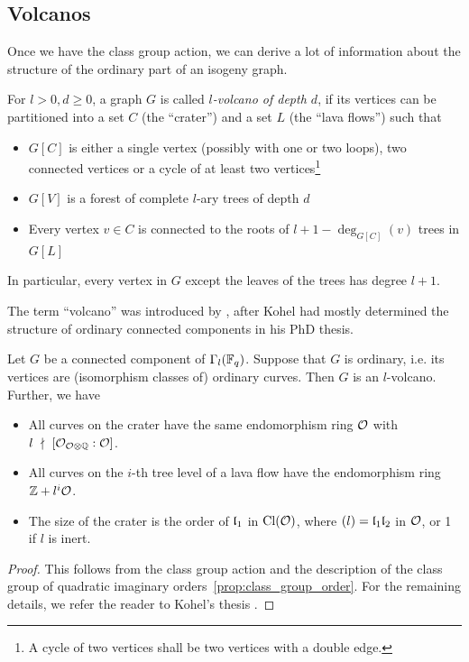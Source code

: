 \subsection{Volcanos}
Once we have the class group action, we can derive a lot of information about the structure of the ordinary part of an isogeny graph.
\begin{definition}
    For $l > 0, d \geq 0$, a graph $G$ is called \emph{$l$-volcano of depth $d$}, if its vertices can be partitioned into a set $C$ (the ``crater'') and a set $L$ (the ``lava flows'') such that
    \begin{itemize}
        \item $G[C]$ is either a single vertex (possibly with one or two loops), two connected vertices or a cycle of at least two vertices\footnote{A cycle of two vertices shall be two vertices with a double edge.}
        \item $G[V]$ is a forest of complete $l$-ary trees of depth $d$
        \item Every vertex $v \in C$ is connected to the roots of $l + 1 - \deg_{G[C]}(v)$ trees in $G[L]$
    \end{itemize}
    In particular, every vertex in $G$ except the leaves of the trees has degree $l + 1$.
\end{definition}
The term ``volcano'' was introduced by \cite{isogeny_vulcano}, after Kohel had mostly determined the structure of ordinary connected components in his PhD thesis.
\begin{theorem}
    \label{prop:isogeny_vulcano}
    Let $G$ be a connected component of $\Gamma_l(\mathbb{F}_q)$.
    Suppose that $G$ is ordinary, i.e. its vertices are (isomorphism classes of) ordinary curves.
    Then $G$ is an $l$-volcano.
    Further, we have
    \begin{itemize}
        \item All curves on the crater have the same endomorphism ring $\mathcal{O}$ with $l \ \nmid \  [\mathcal{O}_{\mathcal{O} \otimes \mathbb{Q}} : \mathcal{O}]$.
        \item All curves on the $i$-th tree level of a lava flow have the endomorphism ring $\mathbb{Z} + l^i\mathcal{O}$.
        \item The size of the crater is the order of $\mathfrak{l}_1$ in $\mathrm{Cl}(\mathcal{O})$, where $(l) = \mathfrak{l}_1\mathfrak{l}_2$ in $\mathcal{O}$, or 1 if $l$ is inert.
    \end{itemize} 
\end{theorem}
\begin{proof}
    This follows from the class group action and the description of the class group of quadratic imaginary orders~\ref{prop:class_group_order}.
    For the remaining details, we refer the reader to Kohel's thesis \cite[Prop.~23]{kohel}.
\end{proof}
